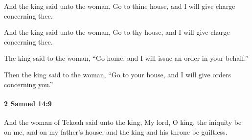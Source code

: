 			And the king said unto the woman, Go to thine house, and I will give charge concerning thee.

			\begin{versebox}
					\item[BHS] 
					\item[ASV] And the king said unto the woman, Go to thy house, and I will give charge concerning thee.
					\item[NIV] The king said to the woman, “Go home, and I will issue an order in your behalf.”
					\item[NRSV] Then the king said to the woman, “Go to your house, and I will give orders concerning you.”
			\end{versebox}

		\paragraph{2 Samuel 14:9} %
			\label{2SAMUEL-14-9}

			And the woman of Tekoah said unto the king, My lord, O king, the iniquity be on me, and on my father’s house: and the king and his throne be guiltless.

